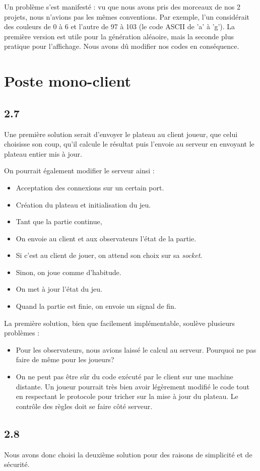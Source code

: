 \documentclass[12pt]{article}
\def\question#1{\subsection{#1}}
\def\sec#1{\section{#1}}
\begin{document}
Un problème s'est manifesté : vu que nous avons pris des morceaux de nos 2 projets, nous n'avions pas les mêmes conventions. Par exemple, l'un considérait des couleurs de 0 à 6 et l'autre de 97 à 103 (le code ASCII de 'a' à 'g'). La première version est utile pour la génération aléaoire, mais la seconde plus pratique pour l'affichage. Nous avons dû modifier nos codes en conséquence.



\sec{Poste mono-client}
\question{2.7}
Une première solution serait d'envoyer le plateau au client joueur, que celui choisisse son coup, qu'il calcule le résultat puis l'envoie au serveur en envoyant le plateau entier mis à jour.


On pourrait également modifier le serveur ainsi :
\begin{itemize}
  \item Acceptation des connexions sur un certain port.
  \item Création du plateau et initialisation du jeu.
  \item Tant que la partie continue,
  \item On envoie au client et aux observateurs l'état de la partie.
  \item Si c'est au client de jouer, on attend son choix sur sa \textit{socket}.
  \item Sinon, on joue comme d'habitude.
  \item On met à jour l'état du jeu.
  \item Quand la partie est finie, on envoie un signal de fin.
\end{itemize}


La première solution, bien que facilement implémentable, soulève plusieurs problèmes :
\begin{itemize}
\item Pour les observateurs, nous avions laissé le calcul au serveur. Pourquoi ne pas faire de même pour les joueurs?
\item On ne peut pas être sûr du code exécuté par le client sur une machine distante. Un joueur pourrait très bien avoir légèrement modifié le code tout en respectant le protocole pour tricher sur la mise à jour du plateau. Le contrôle des règles doit se faire côté serveur.
\end{itemize}



\question{2.8}
Nous avons donc choisi la deuxième solution pour des raisons de simplicité et de sécurité.
\end{document}
